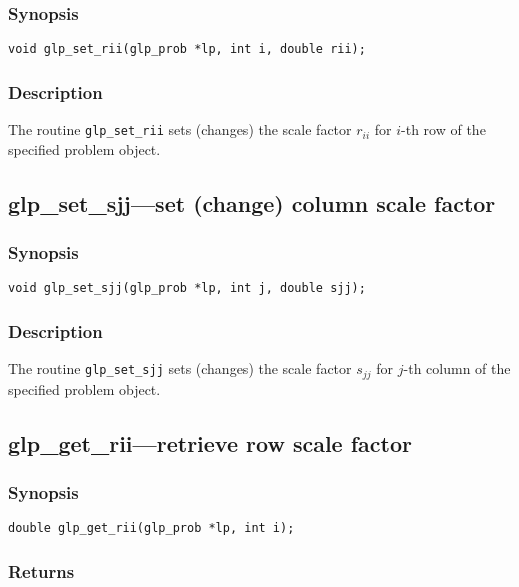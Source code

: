 \subsubsection*{Synopsis}

\begin{verbatim}
void glp_set_rii(glp_prob *lp, int i, double rii);
\end{verbatim}

\subsubsection*{Description}

The routine \verb|glp_set_rii| sets (changes) the scale factor $r_{ii}$
for $i$-th row of the specified problem object.

\subsection{glp\_set\_sjj---set (change) column scale factor}

\subsubsection*{Synopsis}

\begin{verbatim}
void glp_set_sjj(glp_prob *lp, int j, double sjj);
\end{verbatim}

\subsubsection*{Description}

The routine \verb|glp_set_sjj| sets (changes) the scale factor $s_{jj}$
for $j$-th column of the specified problem object.

\subsection{glp\_get\_rii---retrieve row scale factor}

\subsubsection*{Synopsis}

\begin{verbatim}
double glp_get_rii(glp_prob *lp, int i);
\end{verbatim}

\subsubsection*{Returns}

